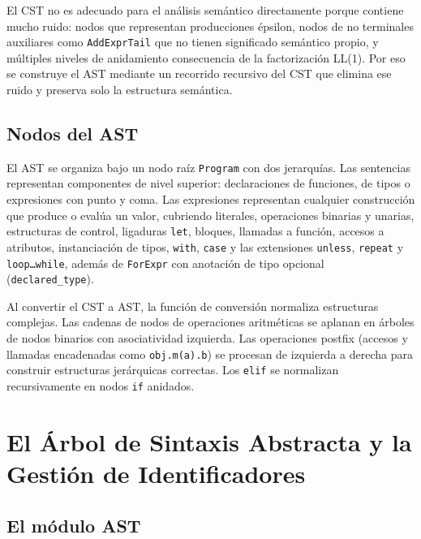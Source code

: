 \documentclass[11pt,a4paper]{article}
\begin{document}
El CST no es adecuado para el análisis semántico directamente porque contiene mucho ruido: nodos que representan producciones épsilon, nodos de no terminales auxiliares como \texttt{AddExprTail} que no tienen significado semántico propio, y múltiples niveles de anidamiento consecuencia de la factorización LL(1). Por eso se construye el AST mediante un recorrido recursivo del CST que elimina ese ruido y preserva solo la estructura semántica.

\subsection{Nodos del AST}

El AST se organiza bajo un nodo raíz \texttt{Program} con dos jerarquías. Las sentencias representan componentes de nivel superior: declaraciones de funciones, de tipos o expresiones con punto y coma. Las expresiones representan cualquier construcción que produce o evalúa un valor, cubriendo literales, operaciones binarias y unarias, estructuras de control, ligaduras \texttt{let}, bloques, llamadas a función, accesos a atributos, instanciación de tipos, \texttt{with}, \texttt{case} y las extensiones \texttt{unless}, \texttt{repeat} y \texttt{loop\ldots while}, además de \texttt{ForExpr} con anotación de tipo opcional (\texttt{declared\_type}).

Al convertir el CST a AST, la función de conversión normaliza estructuras complejas. Las cadenas de nodos de operaciones aritméticas se aplanan en árboles de nodos binarios con asociatividad izquierda. Las operaciones postfix (accesos y llamadas encadenadas como \texttt{obj.m(a).b}) se procesan de izquierda a derecha para construir estructuras jerárquicas correctas. Los \texttt{elif} se normalizan recursivamente en nodos \texttt{if} anidados.

\section{El Árbol de Sintaxis Abstracta y la Gestión de Identificadores}

\subsection{El módulo AST}
\end{document}

